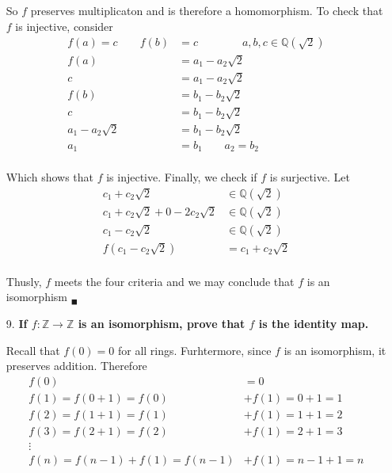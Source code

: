 \documentclass{article}
\begin{document}
\begin{enumerate}
 			So $f$ preserves multiplicaton and is therefore a homomorphism. To check that $f$ is 
 			injective, consider
 			\begin{align*}
 				f(a) = c \qquad f(b) & = c \qquad \qquad a, b, c \in \mathbb{Q}(\sqrt{2}) \\
 				f(a) & = a_1 - a_2\sqrt{2} \\
 				c & = a_1 - a_2\sqrt{2} \\
 				f(b) & = b_1 - b_2\sqrt{2} \\
 				c & = b_1 - b_2\sqrt{2} \\
 				a_1 - a_2\sqrt{2} & = b_1 - b_2\sqrt{2} \\
 				a_1 & = b_1 \qquad a_2 = b_2 \\
 			\end{align*}

 			Which shows that $f$ is injective. Finally, we check if $f$ is surjective. Let
 			\begin{align*}
 				c_1 + c_2\sqrt{2} & \in \mathbb{Q}(\sqrt{2}) \\
 				c_1 + c_2\sqrt{2} + 0 - 2c_2\sqrt{2} & \in \mathbb{Q}(\sqrt{2}) \\
 				c_1 - c_2\sqrt{2} & \in \mathbb{Q}(\sqrt{2}) \\
 				f(c_1 - c_2\sqrt{2}) & = c_1 + c_2\sqrt{2} \\
 			\end{align*}

 			Thusly, $f$ meets the four criteria and we may conclude that $f$ is an isomorphism
 			$_{\blacksquare}$

		\item [9.] \textbf{If $f:\mathbb{Z} \rightarrow \mathbb{Z}$ is an isomorphism, prove that 
						   $f$ is the identity map.}

			Recall that $f(0) = 0$ for all rings. Furhtermore, since $f$ is an isomorphism, it 
			preserves addition. Therefore
			\begin{align*}
				f(0) & = 0 \\
				f(1) = f(0 + 1) = f(0) & + f(1) = 0 + 1 = 1 \\
				f(2) = f(1 + 1) = f(1) & + f(1) = 1 + 1 = 2 \\
				f(3) = f(2 + 1) = f(2) & + f(1) = 2 + 1 = 3 \\
				\vdots \\
				f(n) = f(n-1) + f(1) = f(n-1) & + f(1) = n - 1 + 1 = n \\
			\end{align*}


\end{enumerate}
\end{document}
